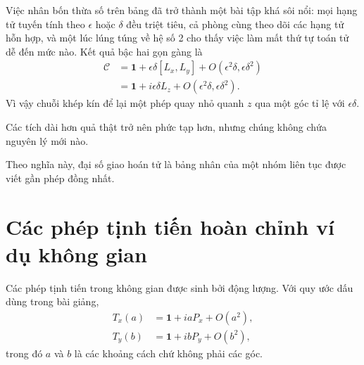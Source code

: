Việc nhân bốn thừa số trên bảng đã trở thành một bài tập khá sôi nổi: mọi hạng tử tuyến tính theo \(\epsilon\) hoặc \(\delta\) đều triệt tiêu, cả phòng cùng theo dõi các hạng tử hỗn hợp, và một lúc lúng túng về hệ số 2 cho thấy việc làm mất thứ tự toán tử dễ đến mức nào. Kết quả bậc hai gọn gàng là
\begin{align}
\mathcal C
&=\mathbf 1+\epsilon\delta[L_x,L_y]
  +O(\epsilon^2\delta,\epsilon\delta^2)\\
&=\mathbf 1+i\epsilon\delta L_z
  +O(\epsilon^2\delta,\epsilon\delta^2).
\end{align}
Vì vậy chuỗi khép kín để lại một phép quay nhỏ quanh \(z\) qua một góc tỉ lệ với \(\epsilon\delta\). 

\begin{classroomqa}
\end{classroomqa}

Các tích dài hơn quả thật trở nên phức tạp hơn, nhưng chúng không chứa nguyên lý mới nào.

\begin{classroomqa}
\end{classroomqa}

Theo nghĩa này, đại số giao hoán tử là bảng nhân của một nhóm liên tục được viết gần phép đồng nhất.

\section{Các phép tịnh tiến hoàn chỉnh ví dụ không gian}

Các phép tịnh tiến trong không gian được sinh bởi động lượng. Với quy ước dấu dùng trong bài giảng,
\begin{equation}
\begin{aligned}
T_x(a)&=\mathbf 1+iaP_x+O(a^2),\\
T_y(b)&=\mathbf 1+ibP_y+O(b^2),
\end{aligned}
\end{equation}
trong đó \(a\) và \(b\) là các khoảng cách chứ không phải các góc.

